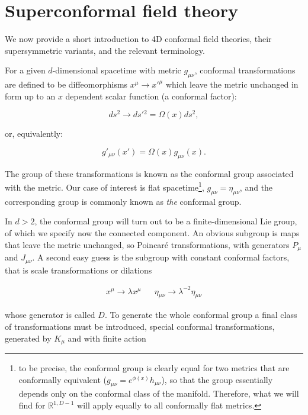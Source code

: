 \section{Superconformal field theory}

We now provide a short introduction to 4D conformal field theories, their supersymmetric variants, and the relevant terminology.

For a given $d$-dimensional spacetime with metric $g_{\mu\nu}$, conformal transformations are defined to be diffeomorphisms $x^\mu \rightarrow x'^\mu$ which leave the metric unchanged in form up to an $x$ dependent scalar function (a conformal factor):

\begin{equation}
	ds^2 \rightarrow ds'{}^2 = \Omega(x) ds^2,
	\label{}
\end{equation}

or, equivalently:

\begin{equation}
	g'_{\mu\nu}(x') = \Omega(x) g_{\mu\nu}(x).
	\label{}
\end{equation}

The group of these transformations is known as the conformal group associated with the metric. Our case of interest is flat spacetime\footnote{to be precise, the conformal group is clearly equal for two metrics that are conformally equivalent ($g_{\mu\nu} = e^{\phi(x)} h_{\mu\nu}$), so that the group essentially depends only on the conformal class of the manifold. Therefore, what we will find for $\mathbb{R}^{1,D-1}$ will apply equally to all conformally flat metrics.}, $g_{\mu\nu} = \eta_{\mu\nu}$, and the corresponding group is commonly known as \emph{the} conformal group.

In $d>2$, the conformal group will turn out to be a finite-dimensional Lie group, of which we specify now the connected component. An obvious subgroup is maps that leave the metric unchanged, so Poincar\'e transformations, with generators $P_\mu$ and $J_{\mu\nu}$. A second easy guess is the subgroup with constant conformal factors, that is scale transformations or dilations

\begin{align}
	x^\mu \rightarrow \lambda x^\mu && \eta_{\mu\nu} \rightarrow \lambda^{-2} \eta_{\mu\nu}
	\label{}
\end{align}

whose generator is called $D$. To generate the whole conformal group a final class of transformations must be introduced, special conformal transformations, generated by $K_\mu$ and with finite action

